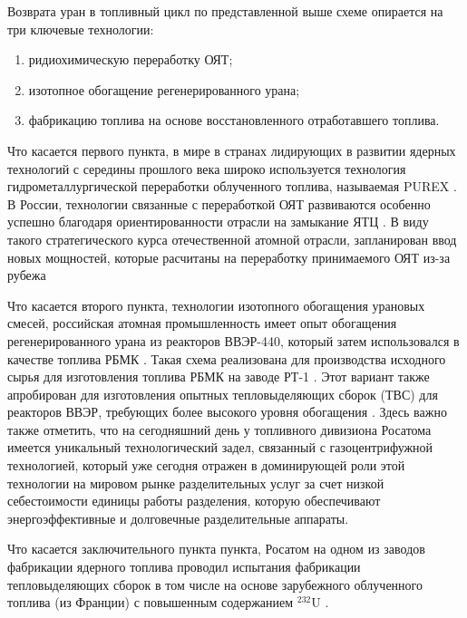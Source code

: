Возврата уран в топливный цикл по представленной выше схеме опирается на три ключевые технологии:
\begin{enumerate}
  \item ридиохимическую переработку ОЯТ;
  \item изотопное обогащение регенерированного урана;
  \item фабрикацию топлива на основе восстановленного отработавшего топлива.
\end{enumerate}

Что касается первого пункта, в мире в странах лидирующих в развитии ядерных технологий с середины прошлого века широко используется технология гидрометаллургической переработки облученного топлива, называемая PUREX \cite{selvaduraySurveyNuclearFuel1979}. В России, технологии связанные с переработкой ОЯТ развиваются особенно успешно благодаря ориентированности отрасли на замыкание ЯТЦ \cite{balihinSostoyaniiPerspektivahRazvitiya2018, efimenkoProblemyPerspektivyRazvitiya2017}. В виду такого стратегического курса отечественной атомной отрасли, запланирован ввод новых мощностей, которые расчитаны на переработку принимаемого ОЯТ из-за рубежа \cite{050519L3942005}

Что касается второго пункта, технологии изотопного обогащения урановых смесей, российская атомная промышленность имеет опыт обогащения регенерированного урана из реакторов ВВЭР-440, который затем использовался в качестве топлива РБМК \cite{VVER10001200Za}. Такая схема реализована для производства исходного сырья для изготовления топлива РБМК на заводе РТ-1 \cite{volkVozvratUranaIz2010}. Этот вариант также апробирован для изготовления опытных тепловыделяющих сборок (ТВС) для реакторов ВВЭР, требующих более высокого уровня обогащения \cite{proselkovAnalizVozmozhnostiIspolzovaniya2003}. Здесь важно также отметить, что на сегодняшний день у топливного дивизиона Росатома имеется уникальный технологический задел, связанный с газоцентрифужной технологией, который уже сегодня отражен в доминирующей роли этой технологии на мировом рынке разделительных услуг за счет низкой себестоимости единицы работы разделения, которую обеспечивают энергоэффективные и долговечные разделительные аппараты.

Что касается заключительного пункта пункта, Росатом на одном из заводов фабрикации ядерного топлива проводил испытания фабрикации тепловыделяющих сборок в том числе на основе зарубежного облученного топлива (из Франции) с повышенным содержанием $^{232}$U \cite{kislovRadiacionnyeAspektyIspolzovaniya}.

